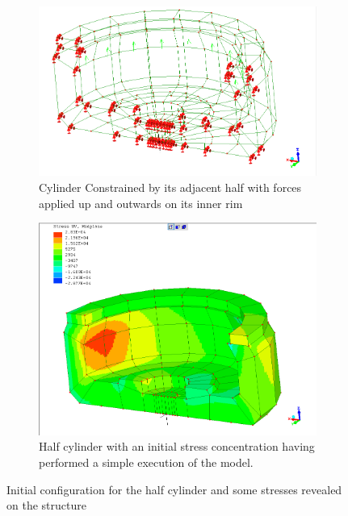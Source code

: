  \begin{figure}[H]
\centering
\begin{subfigure}{.5\textwidth}
  \centering
  \includegraphics[width=0.9\linewidth]{../Graphics/HalfCylinder/ForcesAndConstraintsOnCylinderPNG.png}
  \caption{Cylinder Constrained by its adjacent half with forces applied up and outwards on its inner rim}
  \label{fig:sub1}
\end{subfigure}%
\begin{subfigure}{.5\textwidth}
  \centering
  \includegraphics[width=0.9\linewidth]{../Graphics/HalfCylinder/InitialStress.png}
  \caption{Half cylinder with an initial stress concentration having performed a simple execution of the model.}
  \label{fig:sub2}
\end{subfigure}
\label{fig:test}
  \caption{Initial configuration for the half cylinder and some stresses revealed on the structure}
 \end{figure}
 

